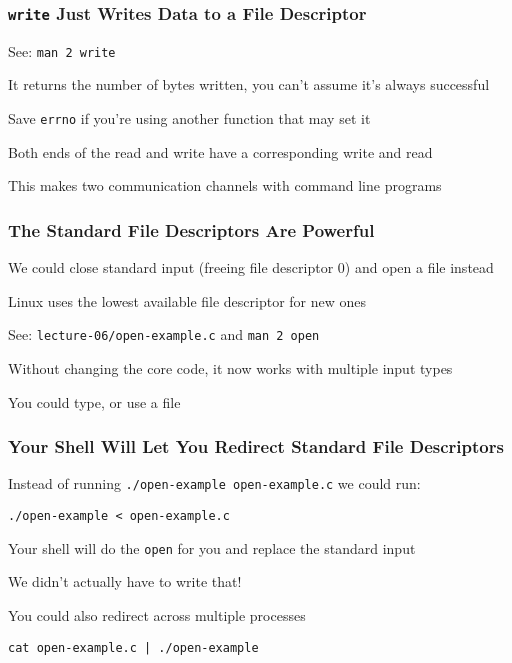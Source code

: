   \begin{frame}
    \frametitle{\texttt{write} Just Writes Data to a File Descriptor}

    See: \texttt{man 2 write}

    \vspace{2em}

    It returns the number of bytes written, you can't assume it's always
    successful

    \hspace{2em} Save \texttt{errno} if you're using another function that may
                 set it

    \vspace{2em}

    Both ends of the read and write have a corresponding write and read

    \hspace{2em} This makes two communication channels with command line programs
  \end{frame}

  \begin{frame}
    \frametitle{The Standard File Descriptors Are Powerful}

    We could close standard input (freeing file descriptor 0) and open a file
    instead

    \hspace{2em} Linux uses the lowest available file descriptor for new ones

    \vspace{2em}

    See: \texttt{lecture-06/open-example.c} and \texttt{man 2 open}
    
    \vspace{2em}

    Without changing the core code, it now works with multiple input types

    \vspace{2em} You could type, or use a file
  \end{frame}

  \begin{frame}
    \frametitle{Your Shell Will Let You Redirect Standard File Descriptors}

    Instead of running \texttt{./open-example open-example.c} we could run:

    \hspace{2em} \texttt{./open-example < open-example.c}

    \vspace{2em}

    Your shell will do the \texttt{open} for you and replace the standard input

    \hspace{2em} We didn't actually have to write that!

    \vspace{2em}

    You could also redirect across multiple processes

    \hspace{2em} \texttt{cat open-example.c | ./open-example} 
  \end{frame}

